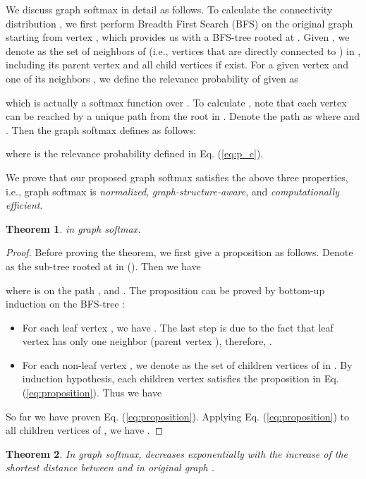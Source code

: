 \documentclass[letterpaper]{article}
\newtheorem{theorem}{Theorem}
\begin{document}
		We discuss graph softmax in detail as follows.
		To calculate the connectivity distribution , we first perform Breadth First Search (BFS) on the original graph  starting from vertex , which provides us with a BFS-tree  rooted at .
		Given , we denote  as the set of neighbors of  (i.e., vertices that are directly connected to ) in , including its parent vertex and all child vertices if exist.
		For a given vertex  and one of its neighbors , we define the relevance probability of  given  as
		
		which is actually a softmax function over .
		To calculate , note that each vertex  can be reached by a unique path from the root  in .
		Denote the path as  where  and .
		Then the graph softmax defines  as follows:
		
		where  is the relevance probability defined in Eq. (\ref{eq:p_c}).
		
		We prove that our proposed graph softmax satisfies the above three properties, i.e., graph softmax is \textit{normalized}, \textit{graph-structure-aware}, and \textit{computationally efficient}.
		
		\begin{theorem}
			 in graph softmax.
		\end{theorem}
		
		\begin{proof}
			Before proving the theorem, we first give a proposition as follows.
			Denote  as the sub-tree rooted at  in  ().
			Then we have
			
			where  is on the path ,  and .			
			The proposition can be proved by bottom-up induction on the BFS-tree :
			\begin{itemize}
				\item
					For each leaf vertex , we have .
					The last step is due to the fact that leaf vertex  has only one neighbor (parent vertex ), therefore, .
				\item
					For each non-leaf vertex , we denote  as the set of children vertices of  in .
					By induction hypothesis, each children vertex  satisfies the proposition in Eq. (\ref{eq:proposition}).
					Thus we have
					
			\end{itemize}
			So far we have proven Eq. (\ref{eq:proposition}).
			Applying Eq. (\ref{eq:proposition}) to all children vertices of , we have
			.
		\end{proof}
		
		\begin{theorem}
		\label{thm:2}
			In graph softmax,  decreases exponentially with the increase of the shortest distance between  and  in original graph .
		\end{theorem}
		
\end{document}
